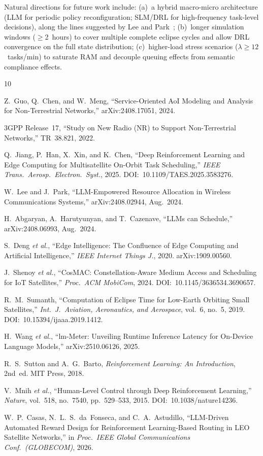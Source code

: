 \documentclass[conference,comsoc,twoside,caption=false]{IEEEtran}
\theoremstyle{definition}
\begin{document}
Natural directions for future work include: (a)~a hybrid macro-micro architecture
(LLM for periodic policy reconfiguration; SLM/DRL for high-frequency task-level
decisions), along the lines suggested by Lee and Park~\cite{lee2024};
(b)~longer simulation windows ($\geq$2~hours) to cover multiple complete eclipse
cycles and allow DRL convergence on the full state distribution; (c)~higher-load
stress scenarios ($\lambda \geq 12$~tasks/min) to saturate RAM and decouple
queuing effects from semantic compliance effects.

\FloatBarrier
\begin{thebibliography}{10}

Z.~Guo, Q.~Chen, and W.~Meng,
``Service-Oriented AoI Modeling and Analysis for Non-Terrestrial Networks,''
arXiv:2408.17051, 2024.

3GPP Release~17,
``Study on New Radio (NR) to Support Non-Terrestrial Networks,''
TR~38.821, 2022.

Q.~Jiang, P.~Han, X.~Xin, and K.~Chen,
``Deep Reinforcement Learning and Edge Computing for Multisatellite On-Orbit
Task Scheduling,''
\emph{IEEE Trans.\ Aerosp.\ Electron.\ Syst.}, 2025.
DOI:~10.1109/TAES.2025.3583276.

W.~Lee and J.~Park,
``LLM-Empowered Resource Allocation in Wireless Communications Systems,''
arXiv:2408.02944, Aug.\ 2024.

H.~Abgaryan, A.~Harutyunyan, and T.~Cazenave,
``LLMs can Schedule,''
arXiv:2408.06993, Aug.\ 2024.

S.~Deng \emph{et al.},
``Edge Intelligence: The Confluence of Edge Computing and Artificial
Intelligence,''
\emph{IEEE Internet Things J.}, 2020.
arXiv:1909.00560.

J.~Shenoy \emph{et al.},
``CosMAC: Constellation-Aware Medium Access and Scheduling for IoT
Satellites,''
\emph{Proc.\ ACM MobiCom}, 2024.
DOI:~10.1145/3636534.3690657.

R.~M.~Sumanth,
``Computation of Eclipse Time for Low-Earth Orbiting Small Satellites,''
\emph{Int.\ J.\ Aviation, Aeronautics, and Aerospace}, vol.~6, no.~5, 2019.
DOI:~10.15394/ijaaa.2019.1412.

H.~Wang \emph{et al.},
``lm-Meter: Unveiling Runtime Inference Latency for On-Device Language
Models,''
arXiv:2510.06126, 2025.

R.~S.~Sutton and A.~G.~Barto,
\emph{Reinforcement Learning: An Introduction}, 2nd~ed.
MIT Press, 2018.

V.~Mnih \emph{et al.},
``Human-Level Control through Deep Reinforcement Learning,''
\emph{Nature}, vol.~518, no.~7540, pp.~529--533, 2015.
DOI:~10.1038/nature14236.

W.~P.~Casas, N.~L.~S.~da~Fonseca, and C.~A.~Astudillo,
``LLM-Driven Automated Reward Design for Reinforcement Learning-Based Routing
in LEO Satellite Networks,''
in \emph{Proc.\ IEEE Global Communications Conf.\ (GLOBECOM)}, 2026.

\end{thebibliography}
\end{document}
